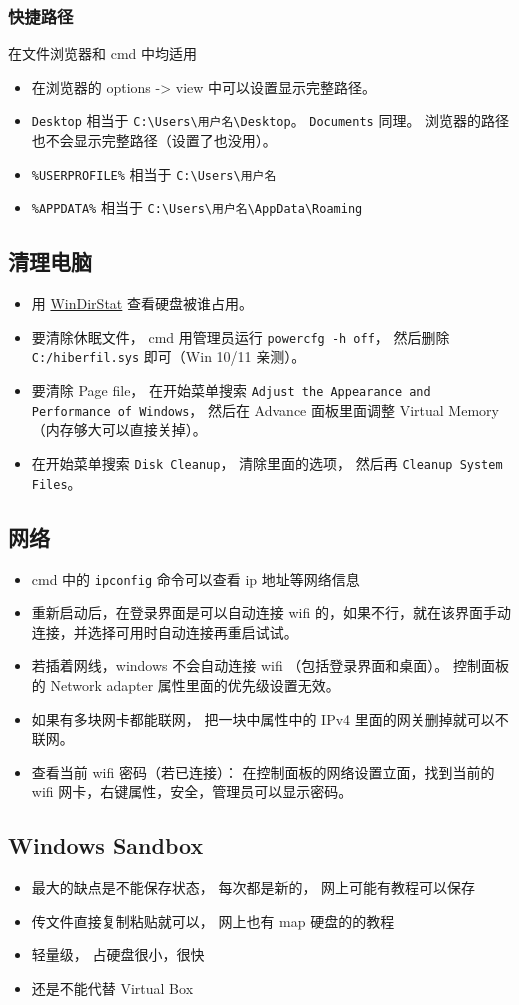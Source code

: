 \subsubsection{快捷路径}
在文件浏览器和 cmd 中均适用
\begin{itemize}
\item 在浏览器的 options -> view 中可以设置显示完整路径。
\item \verb|Desktop| 相当于 \verb|C:\Users\用户名\Desktop|。 \verb|Documents| 同理。 浏览器的路径也不会显示完整路径（设置了也没用）。
\item \verb|%USERPROFILE%| 相当于 \verb|C:\Users\用户名|
\item \verb|%APPDATA%| 相当于 \verb|C:\Users\用户名\AppData\Roaming|
\end{itemize}


\subsection{清理电脑}
\begin{itemize}
\item 用 \href{https://windirstat.net/}{WinDirStat} 查看硬盘被谁占用。
\item 要清除休眠文件， cmd 用管理员运行 \verb|powercfg -h off|， 然后删除 \verb|C:/hiberfil.sys| 即可（Win 10/11 亲测）。
\item 要清除 Page file， 在开始菜单搜索 \verb|Adjust the Appearance and Performance of Windows|， 然后在 Advance 面板里面调整 Virtual Memory（内存够大可以直接关掉）。
\item 在开始菜单搜索 \verb|Disk Cleanup|， 清除里面的选项， 然后再 \verb|Cleanup System Files|。
\end{itemize}

\subsection{网络}
\begin{itemize}
\item cmd 中的 \verb|ipconfig| 命令可以查看 ip 地址等网络信息
\item 重新启动后，在登录界面是可以自动连接 wifi 的，如果不行，就在该界面手动连接，并选择可用时自动连接再重启试试。
\item 若插着网线，windows 不会自动连接 wifi （包括登录界面和桌面）。 控制面板的 Network adapter 属性里面的优先级设置无效。
\item 如果有多块网卡都能联网， 把一块中属性中的 IPv4 里面的网关删掉就可以不联网。
\item 查看当前 wifi 密码（若已连接）： 在控制面板的网络设置立面，找到当前的 wifi 网卡，右键属性，安全，管理员可以显示密码。
\end{itemize}

\subsection{Windows Sandbox}
\begin{itemize}
\item 最大的缺点是不能保存状态， 每次都是新的， 网上可能有教程可以保存
\item 传文件直接复制粘贴就可以， 网上也有 map 硬盘的的教程
\item 轻量级， 占硬盘很小，很快
\item 还是不能代替 Virtual Box
\end{itemize}
